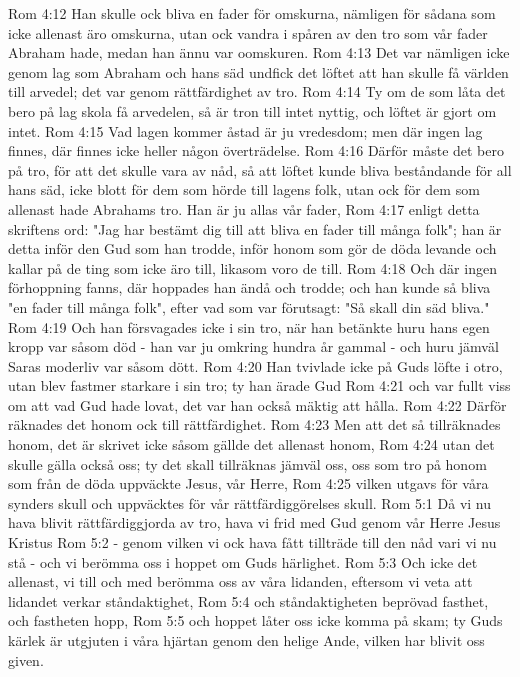 Rom 4:12  Han skulle ock bliva en fader för omskurna, nämligen för sådana som icke allenast äro omskurna, utan ock vandra i spåren av den tro som vår fader Abraham hade, medan han ännu var oomskuren.
Rom 4:13  Det var nämligen icke genom lag som Abraham och hans säd undfick det löftet att han skulle få världen till arvedel; det var genom rättfärdighet av tro.
Rom 4:14  Ty om de som låta det bero på lag skola få arvedelen, så är tron till intet nyttig, och löftet är gjort om intet.
Rom 4:15  Vad lagen kommer åstad är ju vredesdom; men där ingen lag finnes, där finnes icke heller någon överträdelse.
Rom 4:16  Därför måste det bero på tro, för att det skulle vara av nåd, så att löftet kunde bliva beståndande för all hans säd, icke blott för dem som hörde till lagens folk, utan ock för dem som allenast hade Abrahams tro. Han är ju allas vår fader,
Rom 4:17  enligt detta skriftens ord: "Jag har bestämt dig till att bliva en fader till många folk"; han är detta inför den Gud som han trodde, inför honom som gör de döda levande och kallar på de ting som icke äro till, likasom voro de till.
Rom 4:18  Och där ingen förhoppning fanns, där hoppades han ändå och trodde; och han kunde så bliva "en fader till många folk", efter vad som var förutsagt: "Så skall din säd bliva."
Rom 4:19  Och han försvagades icke i sin tro, när han betänkte huru hans egen kropp var såsom död - han var ju omkring hundra år gammal - och huru jämväl Saras moderliv var såsom dött.
Rom 4:20  Han tvivlade icke på Guds löfte i otro, utan blev fastmer starkare i sin tro; ty han ärade Gud
Rom 4:21  och var fullt viss om att vad Gud hade lovat, det var han också mäktig att hålla.
Rom 4:22  Därför räknades det honom ock till rättfärdighet.
Rom 4:23  Men att det så tillräknades honom, det är skrivet icke såsom gällde det allenast honom,
Rom 4:24  utan det skulle gälla också oss; ty det skall tillräknas jämväl oss, oss som tro på honom som från de döda uppväckte Jesus, vår Herre,
Rom 4:25  vilken utgavs för våra synders skull och uppväcktes för vår rättfärdiggörelses skull.
Rom 5:1  Då vi nu hava blivit rättfärdiggjorda av tro, hava vi frid med Gud genom vår Herre Jesus Kristus
Rom 5:2  - genom vilken vi ock hava fått tillträde till den nåd vari vi nu stå - och vi berömma oss i hoppet om Guds härlighet.
Rom 5:3  Och icke det allenast, vi till och med berömma oss av våra lidanden, eftersom vi veta att lidandet verkar ståndaktighet,
Rom 5:4  och ståndaktigheten beprövad fasthet, och fastheten hopp,
Rom 5:5  och hoppet låter oss icke komma på skam; ty Guds kärlek är utgjuten i våra hjärtan genom den helige Ande, vilken har blivit oss given.
